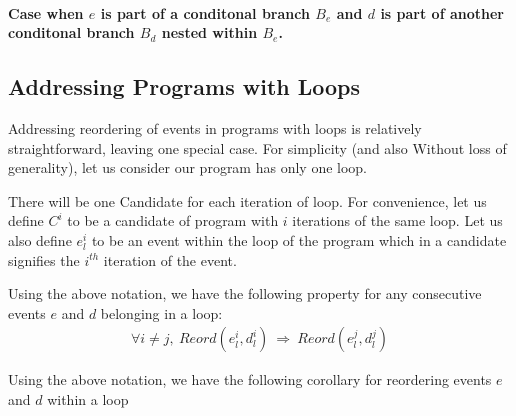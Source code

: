         \paragraph{Case when $e$ is part of a conditonal branch $B_e$ and $d$ is part of another conditonal branch $B_d$ nested within $B_e$.}




    
    \subsection{Addressing Programs with Loops}
        
        Addressing reordering of events in programs with loops is relatively straightforward, leaving one special case. 
        For simplicity (and also Without loss of generality), let us consider our program has only one loop.

        There will be one Candidate for each iteration of loop. For convenience, let us define $C^i$ to be a candidate of program with $i$ iterations of the same loop. Let us also define $e_l^i$ to be an event within the loop of the program which in a candidate signifies the $i^{th}$ iteration of the event. 

        Using the above notation, we have the following property for any consecutive events $e$ and $d$ belonging in a loop:
        \begin{align*}
            \forall i \neq j, \ Reord(e_l^i, d_l^i) \ \Rightarrow \ Reord(e_l^j, d_l^j)
        \end{align*}

        Using the above notation, we have the following corollary for reordering events $e$ and $d$ within a loop 
        

